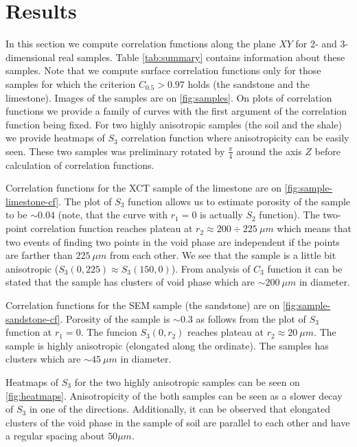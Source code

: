 \documentclass[1p]{elsarticle}
\begin{document}
\section{Results}
In this section we compute correlation functions along the plane $XY$ for 2- and
3-dimensional real samples. Table \ref{tab:summary} contains information about
these samples. Note that we compute surface correlation functions only for those
samples for which the criterion $C_{0.5} > 0.97$ holds (the sandstone and the
limestone). Images of the samples are on \cref{fig:samples}. On plots of
correlation functions we provide a family of curves with the first argument of
the correlation function being fixed. For two highly anisotropic samples (the
soil and the shale) we provide heatmaps of $S_3$ correlation function where
anisotropicity can be easily seen. These two samples was preliminary rotated by
$\frac{\pi}{4}$ around the axis $Z$ before calculation of correlation functions.

Correlation functions for the XCT sample of the limestone are on
\cref{fig:sample-limestone-cf}. The plot of $S_3$ function allows us to estimate
porosity of the sample to be $\sim 0.04$ (note, that the curve with $r_1 = 0$ is
actually $S_2$ function). The two-point correlation function reaches plateau at
$r_2 \approx 200\div 225\ \mu m$ which means that two events of finding two
points in the void phase are independent if the points are farther than
$225\ \mu m$ from each other. We see that the sample is a little bit anisotropic
($S_3(0, 225) \approx S_3(150, 0)$). From analysis of $C_3$ function it can be
stated that the sample has clusters of void phase which are $\sim 200\ \mu m$ in
diameter.

Correlation functions for the SEM sample (the sandstone) are on
\cref{fig:sample-sandstone-cf}. Porosity of the sample is $\sim 0.3$ as follows
from the plot of $S_3$ function at $r_1 = 0$. The funcion $S_3(0, r_2)$ reaches
plateau at $r_2 \approx 20\ \mu m$. The sample is highly anisotropic (elongated
along the ordinate). The samples has clusters which are $\sim 45\ \mu m$ in
diameter.

Heatmaps of $S_3$ for the two highly anisotropic samples can be seen on
\cref{fig:heatmaps}. Anisotropicity of the both samples can be seen as a slower
decay of $S_3$ in one of the directions. Additionally, it can be observed that
elongated clusters of the void phase in the sample of soil are parallel to each
other and have a regular spacing about $50 \mu m$.
\end{document}
